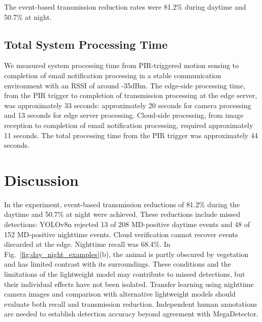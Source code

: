 \documentclass[conference]{IEEEtran}
\begin{document}
\begin{table}[tb]
    \caption{Transmission Reduction by Day/Night (Event Basis)}
    \label{tab:comm_reduction}
        \begin{center}\footnotesize
    \end{center}
    \end{table}

The event-based transmission reduction rates were 81.2\% during daytime and 50.7\% at night.

\subsection{Total System Processing Time}
We measured system processing time from PIR-triggered motion sensing to completion of email notification processing in a stable communication environment with an RSSI of around -35dBm. The edge-side processing time, from the PIR trigger to completion of transmission processing at the edge server, was approximately 33 seconds: approximately 20 seconds for camera processing and 13 seconds for edge server processing. Cloud-side processing, from image reception to completion of email notification processing, required approximately 11 seconds. The total processing time from the PIR trigger was approximately 44 seconds.

\section{Discussion}

In the experiment, event-based transmission reductions of 81.2\% during the daytime and 50.7\% at night were achieved. These reductions include missed detections: YOLOv8n rejected 13 of 208 MD-positive daytime events and 48 of 152 MD-positive nighttime events. Cloud verification cannot recover events discarded at the edge. Nighttime recall was 68.4\%. In Fig.~\ref{fig:day_night_examples}(b), the animal is partly obscured by vegetation and has limited contrast with its surroundings. These conditions and the limitations of the lightweight model may contribute to missed detections, but their individual effects have not been isolated. Transfer learning using nighttime camera images and comparison with alternative lightweight models should evaluate both recall and transmission reduction. Independent human annotations are needed to establish detection accuracy beyond agreement with MegaDetector.
\end{document}

